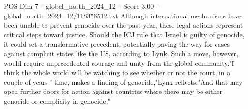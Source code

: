 \begin{textsample}{POS Dim 7 – global\_north\_2024\_12 – Score 3.00 – global\_north\_2024\_12/118356512.txt}
Although international mechanisms have been unable to prevent genocide over the past year, these legal actions represent critical steps toward justice.
Should the ICJ rule that Israel is guilty of genocide, it could set a transformative precedent, potentially paving the way for cases against complicit states like the US, according to Lynk.
Such a move, however, would require unprecedented courage and unity from the global community."I think the whole world will be watching to see whether or not the court, in a couple of years ' time, makes a finding of genocide,"Lynk reflects."And that may open further doors for action against countries where there may be either genocide or complicity in genocide."

\end{textsample}
